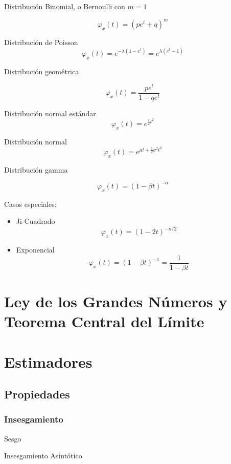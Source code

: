 \documentclass[]{article}
\begin{document}
Distribución Binomial, o Bernoulli con \(m=1\)

\[
\varphi_x (t) = (pe^t + q)^m
\]

Distribución de Poisson \[
\varphi_x (t) = e^{- \lambda (1-e^t)} = e^{\lambda (e^t - 1 )}
\]

Distribución geométrica

\[
\varphi_x (t) = \frac{pe^t }{1-qe^t}
\]

Distribución normal estándar \[
\varphi_x (t) = e^{ \frac{1}{2} t^2}
\]

Distribución normal \[
\varphi_x (t) = e^{ \mu t + \frac{1}{2} \sigma^2 t^2}
\]

Distribución gamma

\[
\varphi_x (t) = (1 - \beta t)^{- \alpha}
\]

Casos especiales:

\begin{itemize}
\item
  Ji-Cuadrado \[
  \varphi_x (t) = (1 - 2 t)^{- n/2}
  \]
\item
  Exponencial \[
  \varphi_x (t) = (1 - \beta t)^{-1} = \frac{1}{1- \beta t}
  \]
\end{itemize}

\hypertarget{ley-de-los-grandes-numeros-y-teorema-central-del-limite}{%
\section{Ley de los Grandes Números y Teorema Central del
Límite}\label{ley-de-los-grandes-numeros-y-teorema-central-del-limite}}

\hypertarget{estimadores}{%
\section{Estimadores}\label{estimadores}}

\hypertarget{propiedades}{%
\subsection{Propiedades}\label{propiedades}}

\hypertarget{insesgamiento}{%
\subsubsection{Insesgamiento}\label{insesgamiento}}

Sesgo

Insesgamiento Asintótico
\end{document}
